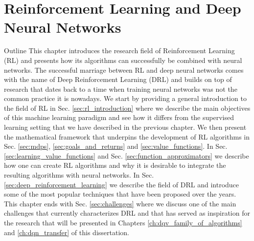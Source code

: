 \chapter{Reinforcement Learning and Deep Neural Networks}
\label{ch:reinforcement_learning}


\begin{remark}{Outline}
This chapter introduces the research field of Reinforcement Learning (RL) and presents how its algorithms can successfully be combined with neural networks. The successful marriage between RL and deep neural networks comes with the name of Deep Reinforcement Learning (DRL) and builds on top of research that dates back to a time when training neural networks was not the common practice it is nowadays. We start by providing a general introduction to the field of RL in Sec. \ref{sec:rl_introduction} where we describe the main objectives of this machine learning paradigm and see how it differs from the supervised learning setting that we have described in the previous chapter. We then present the mathematical framework that underpins the development of RL algorithms in Sec. \ref{sec:mdps}, \ref{sec:goals_and_returns} and \ref{sec:value_functions}. In Sec. \ref{sec:learning_value_functions} and Sec. \ref{sec:function_approximators} we describe how one can create RL algorithms and why it is desirable to integrate the resulting algorithms with neural networks. In Sec. \ref{sec:deep_reinforcement_learning} we describe the field of DRL and introduce some of the most popular techniques that have been proposed over the years. This chapter ends with Sec. \ref{sec:challenges} where we discuss one of the main challenges that currently characterizes DRL and that has served as inspiration for the research that will be presented in Chapters \ref{ch:dqv_family_of_algorithms} and \ref{ch:dqn_transfer} of this dissertation.

\end{remark}


